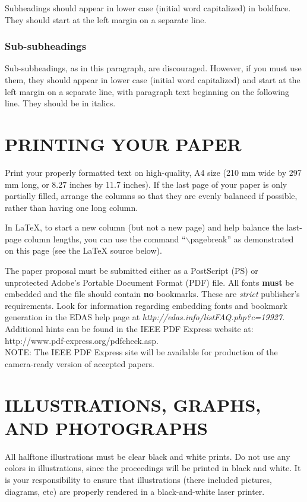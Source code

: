 \documentclass[a4paper]{article}
\begin{document}
Subheadings should appear in lower case (initial word capitalized) in
boldface.  They should start at the left margin on a separate line.
 
\subsubsection{Sub-subheadings}
\label{sssec:subsubhead}

Sub-subheadings, as in this paragraph, are discouraged. However, if you
must use them, they should appear in lower case (initial word
capitalized) and start at the left margin on a separate line, with paragraph
text beginning on the following line.  They should be in italics.

\section{PRINTING YOUR PAPER}
\label{sec:print}

Print your properly formatted text on high-quality, A4 size (210 mm
wide by 297 mm long, or 8.27 inches by 11.7 inches). If the last page
of your paper is only partially filled, arrange the columns so that
they are evenly balanced if possible, rather than having one long
column.

In LaTeX, to start a new column (but not a new page) and help balance the
last-page column lengths, you can use the command ``$\backslash$pagebreak'' as
demonstrated on this page (see the LaTeX source below).

The paper proposal must be submitted either as a Post\-Script (PS)
or unprotected Adobe's Portable Document Format (PDF) file. All fonts
{\bf must} be embedded and the file should contain {\bf no}
bookmarks. These are {\em strict} publisher's requirements. Look for
information regarding embedding fonts and bookmark generation in the
EDAS help page at {\em
http://edas.info/listFAQ.php?c=19927}. Additional hints can be found in
the IEEE PDF Express website at:
http://www.pdf-express.org/pdfcheck.asp. \\
{\small NOTE: The IEEE PDF Express site will be available for production of the camera-ready version of accepted papers.}


\section{ILLUSTRATIONS, GRAPHS, AND PHOTOGRAPHS}
\label{sec:illust}

All halftone illustrations must be clear black and white prints.  Do
not use any colors in illustrations, since the proceedings will be
printed in black and white. It is your responsibility to ensure that
illustrations (there included pictures, diagrams, etc) are properly
rendered in a black-and-white laser printer. 
\end{document}
